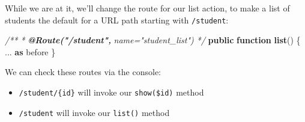 \documentclass[a4paperpaper,openright]{book}
\newenvironment{Shaded}{}{}
\newcommand{\AnnotationTok}[1]{\textcolor[rgb]{0.38,0.63,0.69}{\textbf{\textit{#1}}}}
\newcommand{\CommentTok}[1]{\textcolor[rgb]{0.38,0.63,0.69}{\textit{#1}}}
\newcommand{\KeywordTok}[1]{\textcolor[rgb]{0.00,0.44,0.13}{\textbf{#1}}}
\newcommand{\NormalTok}[1]{#1}
\newcommand{\OtherTok}[1]{\textcolor[rgb]{0.00,0.44,0.13}{#1}}
\newcommand{\StringTok}[1]{\textcolor[rgb]{0.25,0.44,0.63}{#1}}
\providecommand{\tightlist}{%
  \setlength{\itemsep}{0pt}\setlength{\parskip}{0pt}}
\begin{document}
\begin{Shaded}
\end{Shaded}

While we are at it, we'll change the route for our list action, to make
a list of students the default for a URL path starting with
\texttt{/student}:

\begin{Shaded}
\begin{Highlighting}[]
        \CommentTok{/**}
\CommentTok{         * }\AnnotationTok{@Route("/student",}\CommentTok{ name="student_list")}
\CommentTok{         */}
        \KeywordTok{public} \KeywordTok{function} \KeywordTok{list}\OtherTok{()}
\NormalTok{        \{}
            \StringTok{...} \KeywordTok{as}\NormalTok{ before}
\NormalTok{        \}}
\end{Highlighting}
\end{Shaded}

We can check these routes via the console:

\begin{itemize}
\tightlist
\item
  \texttt{/student/\{id\}} will invoke our \texttt{show(\$id)} method
\item
  \texttt{/student} will invoke our \texttt{list()} method
\end{itemize}
\end{document}
